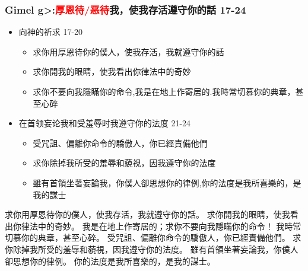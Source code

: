 \subsubsection{Gimel \<g>:\textcolor{red}{厚恩待/恶待}我，使我存活遵守你的話 17-24}
\begin{itemize}
\itemsep-.45em
\item 向神的祈求 17-20
\begin{itemize}
\itemsep-.45em
\item 求你用厚恩待你的僕人，使我存活，我就遵守你的話
\item 求你開我的眼睛，使我看出你律法中的奇妙
\item 求你不要向我隱瞞你的命令,我是在地上作寄居的.我時常切慕你的典章，甚至心碎
\end{itemize}
\item 在首领妄论我和受羞辱时我遵守你的法度 21-24
\begin{itemize}
\itemsep-.45em
\item 受咒詛、偏離你命令的驕傲人，你已經責備他們
\item 求你除掉我所受的羞辱和藐視，因我遵守你的法度
\item 雖有首領坐著妄論我，你僕人卻思想你的律例,你的法度是我所喜樂的，是我的謀士
\end{itemize}
\end{itemize}
求你用厚恩待你的僕人，使我存活，我就遵守你的話。
求你開我的眼睛，使我看出你律法中的奇妙。
我是在地上作寄居的；求你不要向我隱瞞你的命令！
我時常切慕你的典章，甚至心碎。
受咒詛、偏離你命令的驕傲人，你已經責備他們。
求你除掉我所受的羞辱和藐視，因我遵守你的法度。
雖有首領坐著妄論我，你僕人卻思想你的律例。
你的法度是我所喜樂的，是我的謀士。



